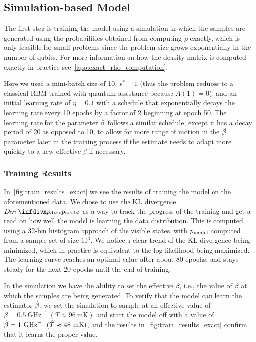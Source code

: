 \subsection{Simulation-based Model}
The first step is training the model using a simulation in which the samples are generated using the probabilities obtained from computing \( \rho \) exactly, which is only feasible for small problems since the problem size grows exponentially in the number of qubits.
For more information on how the density matrix is computed exactly in practice see~\cref{app:exact_rho_computation}.

Here we used a mini-batch size of 10, \( s^* = 1 \) (thus the problem reduces to a classical RBM trained with quantum assistance because \( A(1) = 0 \)), and an initial learning rate of \( \eta = 0.1 \) with a schedule that exponentially decays the learning rate every 10 epochs by a factor of 2 beginning at epoch 50.
The learning rate for the parameter \( \hat{\beta} \) follows a similar schedule, except it has a decay period of 20 as opposed to 10, to allow for more range of motion in the \( \hat{\beta} \) parameter later in the training process if the estimate needs to adapt more quickly to a new effective \( \beta \) if necessary.

\subsubsection{Training Results}
In~\cref{fig:train_results_exact} we see the results of training the model on the aforementioned data.
We chose to use the KL divergence \( \DKL{\pdata}{\pmodel} \) as a way to track the progress of the training and get a read on how well the model is learning the data distribution.
This is computed using a 32-bin histogram approach of the visible states, with \( p_{\text{model}} \) computed from a sample set of size \( 10^4 \).
We notice a clear trend of the KL divergence being minimized, which in practice is equivalent to the log likelihood being maximized.
The learning curve reaches an optimal value after about 80 epochs, and stays steady for the next 20 epochs until the end of training.

In the simulation we have the ability to set the effective \( \beta \), i.e., the value of \( \beta \) at which the samples are being generated.
To verify that the model can learn the estimator \( \hat{\beta} \), we set the simulation to sample at an effective value of \( \beta = 0.5 \ \si{\giga\hertz}^{-1} \ (T \approx 96 \ \si{\milli\kelvin}) \) and start the model off with a value of \( \hat{\beta} = 1 \ \si{\giga\hertz}^{-1} \ (\hat{T} \approx 48 \ \si{\milli\kelvin}) \), and the results in~\cref{fig:train_results_exact} confirm that it learns the proper value.

